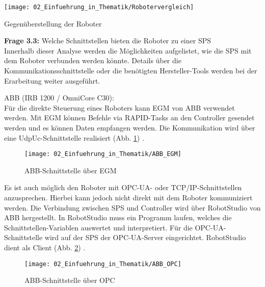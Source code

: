 		\begin{table}[h!]
			\centering
			\texttt{[image: 02\_Einfuehrung\_in\_Thematik/Robotervergleich]}
			\captionsetup{justification=centering}
			\caption{Gegenüberstellung der Roboter}
			\label{tab:Robotervergleich}
		\end{table}
	\vspace{3mm}
	
	\newpage
	
	\textbf{Frage 3.3:} Welche Schnittstellen bieten die Roboter zu einer \Gls{SPS} \vspace{2mm} 
	\\
		Innerhalb dieser Analyse werden die Möglichkeiten aufgelistet, wie die \Gls{SPS} mit dem Roboter verbunden werden könnte. Details über die Kommunikationsschnittstelle oder die benötigten Hersteller-Tools werden bei der Erarbeitung weiter ausgeführt.  
		\vspace{3mm}
		
		ABB (IRB 1200 / OmniCore C30):
		\vspace{2mm}
		\\
		Für die direkte Steuerung eines Roboters kann \Gls{EGM} von ABB verwendet werden. Mit \Gls{EGM} können Befehle via RAPID-Tasks an den Controller gesendet werden und es können Daten empfangen werden. Die Kommunikation wird über eine UdpUc-Schnittstelle realisiert (Abb. \ref{fig:ABB_EGM}) \cite{EGM}. 
		
		\begin{figure}[h!]
			\centering
			\texttt{[image: 02\_Einfuehrung\_in\_Thematik/ABB\_EGM]}
			\captionsetup{justification=centering}
			\caption{ABB-Schnittstelle über \Gls{EGM}}
			\label{fig:ABB_EGM}
		\end{figure}
		
		Es ist auch möglich den Roboter mit OPC-UA- oder TCP/IP-Schnittstellen anzusprechen. Hierbei kann jedoch nicht direkt mit dem Roboter kommuniziert werden. Die Verbindung zwischen \Gls{SPS} und Controller wird über RobotStudio von ABB hergestellt. In RobotStudio muss ein Programm laufen, welches die Schnittstellen-Variablen auswertet und interpretiert. Für die OPC-UA-Schnittstelle wird auf der \Gls{SPS} der OPC-UA-Server eingerichtet. RobotStudio dient als Client (Abb. \ref{fig:ABB_OPC}) \cite{ABB-OPCUA}.
		
		\begin{figure}[h!]
			\centering
			\texttt{[image: 02\_Einfuehrung\_in\_Thematik/ABB\_OPC]}
			\caption{ABB-Schnittstelle über OPC}
			\label{fig:ABB_OPC}
		\end{figure}
		\vspace{3mm}
		
